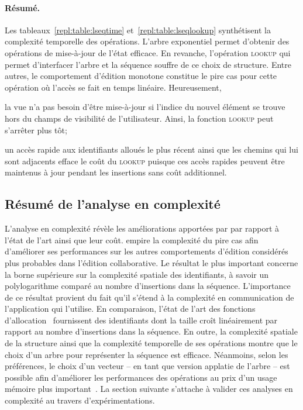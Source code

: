 \paragraph{Résumé.} Les tableaux~\ref{repl:table:lseqtime}
et~\ref{repl:table:lseqlookup} synthétisent la complexité temporelle des
opérations. L'arbre exponentiel permet d'obtenir des opérations de mise-à-jour
de l'état efficace. En revanche, l'opération \textsc{lookup} qui permet
d'interfacer l'arbre et la séquence souffre de ce choix de structure. Entre
autres, le comportement d'édition monotone constitue le pire cas pour cette
opération où l'accès se fait en temps linéaire. Heureusement, 
\begin{inparaenum}[(i)]
\item la vue n'a pas besoin d'être mise-à-jour si l'indice du nouvel élément se
  trouve hors du champs de visibilité de l'utilisateur. Ainsi, la fonction
  \textsc{lookup} peut s'arrêter plus tôt;
\item un accès rapide aux identifiants alloués le plus récent ainsi que les
  chemins qui lui sont adjacents efface le coût du \textsc{lookup} puisque ces
  accès rapides peuvent être maintenus à jour pendant les insertions sans coût
  additionnel.
\end{inparaenum}

\subsection{Résumé de l'analyse en complexité}

L'analyse en complexité révèle les améliorations apportées par \LSEQ par rapport
à l'état de l'art ainsi que leur coût. \LSEQ empire la complexité du pire cas
afin d'améliorer ses performances sur les autres comportements d'édition
considérés plus probables dans l'édition collaborative. Le résultat le plus
important concerne la borne supérieure sur la complexité spatiale des
identifiants, à savoir un polylogarithme comparé au nombre d'insertions dans la
séquence. L'importance de ce résultat provient du fait qu'il s'étend à la
complexité en communication de l'application qui l'utilise. En comparaison,
l'état de l'art des fonctions d'allocation~\cite{preguica2009commutative,
  weiss2009logoot} fournissent des identifiants dont la taille croît
linéairement par rapport au nombre d'insertions dans la séquence.  En outre, la
complexité spatiale de la structure ainsi que la complexité temporelle de ses
opérations montre que le choix d'un arbre pour représenter la séquence est
efficace. Néanmoins, selon les préférences, le choix d'un vecteur -- en tant que
version applatie de l'arbre -- est possible afin d'améliorer les performances
des opérations au prix d'un usage mémoire plus
important~\cite{weiss2009logoot}. La section suivante s'attache à valider ces
analyses en complexité au travers d'expérimentations.


